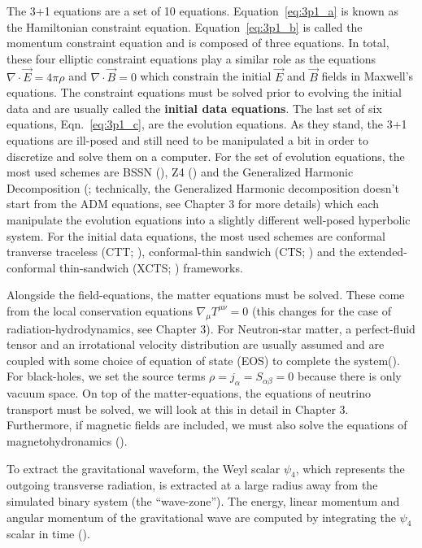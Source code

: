 The 3+1 equations are a set of 10 equations. Equation~\ref{eq:3p1_a} is known as the Hamiltonian constraint equation. Equation~\ref{eq:3p1_b} is called the momentum constraint equation and is composed of three equations. In total, these four elliptic constraint equations play a similar role as the equations $\nabla \cdot \vec E = 4\pi\rho$ and $\nabla \cdot \vec B = 0$ which constrain the initial $\vec E$ and $\vec B$ fields in Maxwell's equations. The constraint equations must be solved prior to evolving the initial data and are usually called the \textbf{initial data equations}. The last set of six equations, Eqn.~\ref{eq:3p1_c}, are the evolution equations. As they stand, the 3+1 equations are ill-posed and still need to be manipulated a bit in order to discretize and solve them on a computer. For the set of evolution equations, the most used schemes are BSSN (\cite{baumgarte1998numerical,shibata1995evolution}), Z4 (\cite{bona2003general}) and the Generalized Harmonic Decomposition (\cite{pretorius2005numerical}; technically, the Generalized Harmonic decomposition doesn't start from the ADM equations, see Chapter 3 for more details) which each manipulate the evolution equations into a slightly different well-posed hyperbolic system. For the initial data equations, the most used schemes are conformal tranverse traceless (CTT; \cite{bowen1980time}), conformal-thin sandwich (CTS; \cite{york1999conformal}) and the extended-conformal thin-sandwich (XCTS; \cite{pfeiffer-york:2005}) frameworks.

Alongside the field-equations, the matter equations must be solved. These come from the local conservation equations $\nabla_{\mu}T^{\mu\nu} = 0$ (this changes for the case of radiation-hydrodynamics, see Chapter 3). For Neutron-star matter, a perfect-fluid tensor and an irrotational velocity distribution are usually assumed and are coupled with some choice of equation of state (EOS) to complete the system(\cite{faber2012binary}). For black-holes, we set the source terms $\rho = j_{\alpha} = S_{\alpha\beta} = 0$ because there is only vacuum space. On top of the matter-equations, the equations of neutrino transport must be solved, we will look at this in detail in Chapter 3. Furthermore, if magnetic fields are included, we must also solve the equations of magnetohydronamics (\cite{baumgarte2003general,shibata2012radiation}).

To extract the gravitational waveform, the Weyl scalar $\psi_{4}$, which represents the outgoing transverse radiation, is extracted at a large radius away from the simulated binary system (the ``wave-zone''). The energy, linear momentum and angular momentum of the gravitational wave are computed by integrating the $\psi_{4}$ scalar in time (\cite{kyutoku2015dynamical}).

